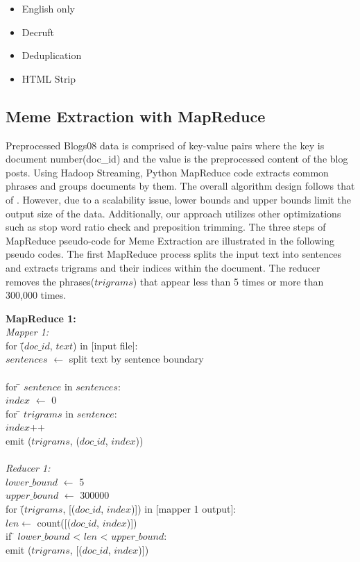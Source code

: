 \documentclass{sig-alternate}
\begin{document}
\begin{itemize}
\item English only
\item Decruft
\item Deduplication
\item HTML Strip
\end{itemize}


\subsection{Meme Extraction with MapReduce}

Preprocessed Blogs08 data is comprised of key-value pairs where the key is document number(doc\_id) and the value is the preprocessed content of the blog posts. Using Hadoop Streaming, Python MapReduce code extracts common phrases and groups documents by them. The overall algorithm design follows that of \cite{Kolak2008}. However, due to a scalability issue, lower bounds and upper bounds limit the output size of the data.  Additionally, our approach utilizes other optimizations such as stop word ratio check and preposition trimming. The three steps of MapReduce pseudo-code for Meme Extraction are illustrated in the following pseudo codes. The first MapReduce process splits the input text into sentences and extracts trigrams and their indices within the document. The reducer removes the phrases($trigrams$) that appear less than 5 times or more than 300,000 times.

\begin{centering}

\begin{tabbing}
\textbf{MapReduce 1:}\\
\emph{Mapper 1:}\\

for \= ($doc\_id$, $text$) in [input file]:\\
\>	$sentences$  $\leftarrow$ split text by sentence boundary\\
\\
\>	for \= $sentence$ in $sentences$:\\
\>\>	$index$ $\leftarrow$ 0\\
\>\>	for \= $trigrams$ in $sentence$:\\
\>\>\>		$index$++	\\
\>\>\>		emit ($trigrams$, ($doc\_id$, $index$))\\
\\
\emph{Reducer 1:}\\
$lower\_bound$  $\leftarrow$ 5\\
$upper\_bound$  $\leftarrow$ 300000\\
for \= ($trigrams$, [($doc\_id$, $index$)]) in [mapper 1 output]:\\
\>	$len \leftarrow$ count([($doc\_id$, $index$)])\\
\> 	if \= $lower\_bound$ < $len$ < $upper\_bound$:\\
\>\>	emit ($trigrams$, [($doc\_id$, $index$)])\\
\end{tabbing}
\end{centering}
\end{document}
